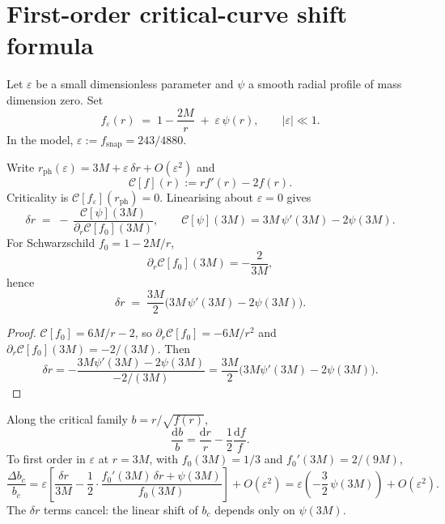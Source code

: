 \section{First-order critical-curve shift formula}
\label{sec:first-order}

\begin{definition}
\label{def:deform}
Let \(\varepsilon\) be a small dimensionless parameter and \(\psi\) a smooth
radial profile of mass dimension zero. Set
\begin{equation}
\label{eq:feps}
f_\varepsilon(r)
\;=\;
1-\frac{2M}{r}
\;+\;
\varepsilon\,\psi(r),
\qquad
|\varepsilon|\ll 1.
\end{equation}
In the model, \(\varepsilon:=f_{\mathrm{snap}}=243/4880\).
\end{definition}

\begin{lemma}
\label{lem:rph-shift}
Write \(r_{\mathrm{ph}}(\varepsilon)=3M+\varepsilon\,\delta r+O(\varepsilon^2)\) and
\[
\mathcal{C}[f](r):=r f'(r)-2f(r).
\]
Criticality is \(\mathcal{C}[f_\varepsilon](r_{\mathrm{ph}})=0\). Linearising about
\(\varepsilon=0\) gives
\begin{equation}
\label{eq:deltar-exact}
\delta r
\;=\;
-\,
\frac{\mathcal{C}[\psi](3M)}{\partial_r\mathcal{C}[f_0](3M)},
\qquad
\mathcal{C}[\psi](3M)=3M\,\psi'(3M)-2\psi(3M).
\end{equation}
For Schwarzschild \(f_0=1-2M/r\),
\[
\partial_r\mathcal{C}[f_0](3M)=-\frac{2}{3M},
\]
hence
\begin{equation}
\label{eq:deltar-ok}
\boxed{
\delta r
\;=\;
\frac{3M}{2}
\bigl(3M\,\psi'(3M)-2\psi(3M)\bigr).
}
\end{equation}
\end{lemma}

\begin{proof}
\(\mathcal{C}[f_0]=6M/r-2\), so \(\partial_r\mathcal{C}[f_0]=-6M/r^2\) and
\(\partial_r\mathcal{C}[f_0](3M)=-2/(3M)\). Then
\[
\delta r
=
-\frac{3M\psi'(3M)-2\psi(3M)}{-2/(3M)}
=
\frac{3M}{2}\bigl(3M\psi'(3M)-2\psi(3M)\bigr).
\]
\end{proof}

\begin{lemma}
\label{lem:bc-shift}
Along the critical family \(b=r/\sqrt{f(r)}\),
\begin{equation}
\label{eq:dlnb}
\frac{\mathrm{d}b}{b}
=
\frac{\mathrm{d}r}{r}
-\frac12\frac{\mathrm{d}f}{f}.
\end{equation}
To first order in \(\varepsilon\) at \(r=3M\), with
\(f_0(3M)=1/3\) and \(f_0'(3M)=2/(9M)\),
\begin{equation}
\label{eq:dbc-final}
\frac{\Delta b_c}{b_c}
=
\varepsilon\left[
\frac{\delta r}{3M}
-\frac12\cdot
\frac{f_0'(3M)\,\delta r+\psi(3M)}{f_0(3M)}
\right]
+O(\varepsilon^2)
=
\varepsilon\left(
-\frac{3}{2}\,\psi(3M)
\right)
+O(\varepsilon^2).
\end{equation}
The \(\delta r\) terms cancel: the linear shift of \(b_c\) depends only on
\(\psi(3M)\).
\end{lemma}

